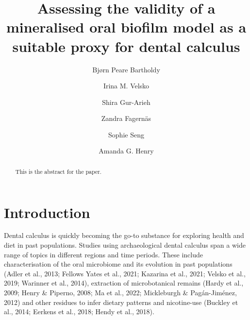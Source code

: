 \documentclass[
]{article}
\title{Assessing the validity of a mineralised oral biofilm model as a
suitable proxy for dental calculus}
\author{Bjørn Peare Bartholdy \and Irina M. Velsko \and Shira
Gur-Arieh \and Zandra Fagernäs \and Sophie Seng \and Amanda G. Henry}
\date{}
\begin{document}
\maketitle
\begin{abstract}
This is the abstract for the paper.
\end{abstract}
\ifdefined\Shaded\renewenvironment{Shaded}{\begin{tcolorbox}[frame hidden, borderline west={3pt}{0pt}{shadecolor}, enhanced, interior hidden, breakable, boxrule=0pt, sharp corners]}{\end{tcolorbox}}\fi

\hypertarget{introduction}{%
\section{Introduction}\label{introduction}}

Dental calculus is quickly becoming the go-to substance for exploring
health and diet in past populations. Studies using archaeological dental
calculus span a wide range of topics in different regions and time
periods. These include characterisation of the oral microbiome and its
evolution in past populations (Adler et al., 2013; Fellows Yates et al.,
2021; Kazarina et al., 2021; Velsko et al., 2019; Warinner et al.,
2014), extraction of microbotanical remains (Hardy et al., 2009; Henry
\& Piperno, 2008; Ma et al., 2022; Mickleburgh \& Pagán-Jiménez, 2012)
and other residues to infer dietary patterns and nicotine-use (Buckley
et al., 2014; Eerkens et al., 2018; Hendy et al., 2018).
\end{document}
